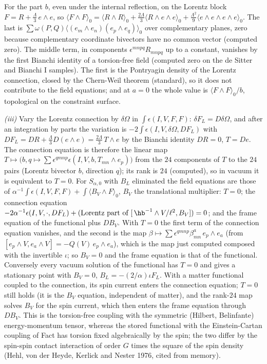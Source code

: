 For the part $b$, even under the internal reflection, on the Lorentz block $F = R + \tfrac{\Lambda}{3}\,e\wedge e$, so $\langle F \wedge F\rangle_{0} = \langle R\wedge R\rangle_{0} + \tfrac{2\Lambda}{3}\langle R \wedge e\wedge e\rangle_{0} + \tfrac{\Lambda^{2}}{9}\langle e\wedge e\wedge e\wedge e\rangle_{0}$. The last is $\sum\omega(P,Q)\langle (e_{m}\wedge e_{n})(e_{p}\wedge e_{q})\rangle_{0}$ over complementary planes, zero because complementary coordinate bivectors have no common vector (computed zero). The middle term, in components $\epsilon^{mnpq}R_{mnpq}$ up to a constant, vanishes by the first Bianchi identity of a torsion-free field (computed zero on the de Sitter and Bianchi I samples). The first is the Pontryagin density of the Lorentz connection, closed by the Chern-Weil theorem (standard), so it does not contribute to the field equations; and at $a = 0$ the whole value is $\langle F\wedge F\rangle_{0}/b$, topological on the constraint surface.

\emph{(iii)} Vary the Lorentz connection by $\delta\Omega$ in $\int\epsilon(I, V, F, F)$: $\delta F_{L} = D\delta\Omega$, and after an integration by parts the variation is $-2\int\epsilon(I, V, \delta\Omega, DF_{L})$ with $DF_{L} = DR + \tfrac{\Lambda}{3}D(e\wedge e) = \tfrac{2\Lambda}{3}\,T\wedge e$ by the Bianchi identity $DR = 0$, $T = De$. The connection equation is therefore the linear map $T \mapsto \big(b, q \mapsto \sum\epsilon^{qmnp}\epsilon(I, V, b, T_{mn}\wedge e_{p})\big)$ from the $24$ components of $T$ to the $24$ pairs (Lorentz bivector $b$, direction $q$); its rank is $24$ (computed), so in vacuum it is equivalent to $T = 0$. For $S_{\alpha, 0}$ with $B_{L}$ eliminated the field equations are those of $\alpha^{-1}\int\epsilon(I, V, F, F) + \int\langle B_{V}\wedge F\rangle_{0}$, $B_{V}$ the translational multiplier: $T = 0$; the connection equation $-2\alpha^{-1}\epsilon(I, V, \cdot, DF_{L}) + (\text{Lorentz part of } [\,\hb^{-1}\wedge V/\ell^{2}, B_{V}])= 0$; and the frame equation of the functional plus $D B_{V}$. With $T = 0$ the first term of the connection equation vanishes, and the second is the map $\beta \mapsto \sum\epsilon^{qmnp}\beta^{a}_{mn}\,e_{p}\wedge e_{a}$ (from $[e_{p}\wedge V, e_{a}\wedge V] = -Q(V)\,e_{p}\wedge e_{a}$), which is the map just computed composed with the invertible $\iota$; so $B_{V} = 0$ and the frame equation is that of the functional. Conversely every vacuum solution of the functional has $T = 0$ and gives a stationary point with $B_{V} = 0$, $B_{L} = -(2/\alpha)\iota F_{L}$. With a matter functional coupled to the connection, its spin current enters the connection equation; $T = 0$ still holds (it is the $B_{V}$ equation, independent of matter), and the rank-$24$ map solves $B_{V}$ for the spin current, which then enters the frame equation through $DB_{V}$. This is the torsion-free coupling with the symmetric (Hilbert, Belinfante) energy-momentum tensor, whereas the stored functional with the Einstein-Cartan coupling of Fact  has torsion fixed algebraically by the spin; the two differ by the spin-spin contact interaction of order $G$ times the square of the spin density (Hehl, von der Heyde, Kerlick and Nester 1976, cited from memory).

